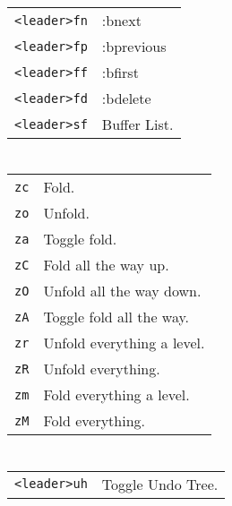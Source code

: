 \begin{multicols}{3}
\section{}
\begin{tabular}{@{}ll@{}}
	\verb!<leader>fn! & :bnext \\
	\verb!<leader>fp! & :bprevious \\
	\verb!<leader>ff! & :bfirst \\
	\verb!<leader>fd! & :bdelete \\
	\verb!<leader>sf! & Buffer List. \\
\end{tabular}

\section{}
\begin{tabular}{@{}ll@{}}
	\verb!zc! & Fold. \\
	\verb!zo! & Unfold. \\
	\verb!za! & Toggle fold. \\
	\verb!zC! & Fold all the way up. \\
	\verb!zO! & Unfold all the way down. \\
	\verb!zA! & Toggle fold all the way. \\
	\verb!zr! & Unfold everything a level.\\
	\verb!zR! & Unfold everything.\\
	\verb!zm! & Fold everything a level. \\
	\verb!zM! & Fold everything. \\
\end{tabular}

\section{}
\begin{tabular}{@{}ll@{}}
	\verb!<leader>uh! & Toggle Undo Tree. \\
\end{tabular}


\end{multicols}

